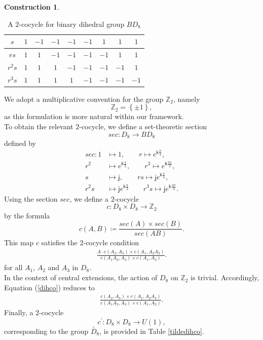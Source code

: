 \documentclass{article}
\theoremstyle{plain}
\theoremstyle{definition}
\newtheorem{const}[thm]{Construction}
\begin{document}
\begin{const}
\begin{table}[H]
\begin{tabular}{ c | c | c | c | c | c | c | c | c }
\hline
$s$ & $1$ & $-1$ & $-1$ & $-1$ & $-1$ & $1$ & $1$ & $1$ \\
\hline
$rs$ & $1$ & $1$ & $-1$ & $-1$ & $-1$ & $-1$ & $1$ & $1$ \\
\hline
$r^2s$ & $1$ & $1$ & $1$ & $-1$ & $-1$ & $-1$ & $-1$ & $1$ \\
\hline
$r^3s$ & $1$ & $1$ & $1$ & $1$ & $-1$ & $-1$ & $-1$ & $-1$
\end{tabular}
\caption{A $2$-cocycle for binary dihedral group $BD_8$}
\label{bindihco}
\end{table}
We adopt a multiplicative convention for the group $\mathbb{Z}_2$, namely 
\[
\mathbb{Z}_2 = \left\{\pm{1}\right\},
\]
as this formulation is more natural within our framework. \\
To obtain the relevant $2$-cocycle, we define a set-theoretic section
\[
sec:D_8 \longrightarrow BD_8
\]
defined by
\begin{align*}
sec:1 & \longmapsto 1, \qquad
r  \longmapsto e^{\mathsf{k}\frac{\pi}{4}}, \\
r^2 & \longmapsto e^{\mathsf{k}\frac{\pi}{2}}, \qquad
r^3  \longmapsto e^{\mathsf{k}\frac{3\pi}{4}}, \\
s & \longmapsto \mathsf{j}, \qquad
rs  \longmapsto \mathsf{j}e^{\mathsf{k}\frac{\pi}{4}}, \\
r^2s & \longmapsto \mathsf{j}e^{\mathsf{k}\frac{\pi}{2}} \qquad
r^3s  \longmapsto \mathsf{j}e^{\mathsf{k}\frac{3\pi}{4}}.
\end{align*}
Using the section $sec$, we define a $2$-cocycle
\[
c:D_8 \times D_8 \longrightarrow \mathbb{Z}_2
\]
by the formula
$$c(A,B) \coloneq \frac{sec(A) \times sec(B)}{sec(AB)}.$$
This map $c$ satisfies the $2$-cocycle condition
\begin{align}\label{dihco}
\frac{A \cdot c(A_2,A_3) \times c(A_1,A_2A_3)}{c(A_1A_2,A_3) \times c(A_1,A_2)}.
\end{align}
for all $A_1$, $A_2$ and $A_3$ in $D_8$. \\
In the context of central extensions, the action of $D_8$ on $\mathbb{Z}_2$ is trivial. Accordingly, Equation (\ref{dihco}) reduces to
\begin{align*}
\frac{c(A_2,A_3) \times c(A_1,A_2A_3)}{c(A_1A_2,A_3) \times c(A_1,A_2)}.
\end{align*}
\noindent
Finally, a $2$-cocycle
\[
c^\prime:D_8 \times D_8 \longrightarrow U(1),
\]
corresponding to the group $\widetilde{D_8}$, is provided in Table \ref{tildedihco}.
\begin{table}[H]
\centering
\begin{tabular}{ c | c | c | c | c | c | c | c | c }

\end{tabular}
\end{table}
\end{const}
\end{document}

